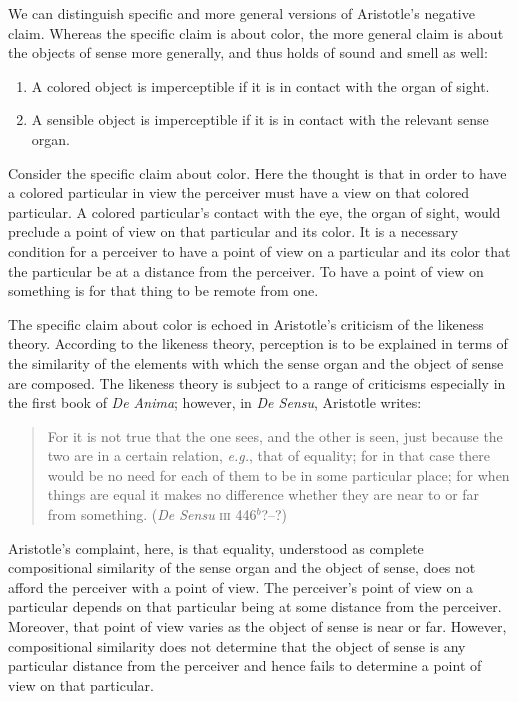 We can distinguish specific and more general versions of Aristotle's negative claim. Whereas the specific claim is about color, the more general claim is about the objects of sense more generally, and thus holds of sound and smell as well:
\begin{enumerate}[(1)]
	\item A colored object is imperceptible if it is in contact with the organ of sight.
	\item A sensible object is imperceptible if it is in contact with the relevant sense organ.
\end{enumerate}

Consider the specific claim about color. Here the thought is that in order to have a colored particular in view the perceiver must have a view on that colored particular. A colored particular's contact with the eye, the organ of sight, would preclude a point of view on that particular and its color. It is a necessary condition for a perceiver to have a point of view on a particular and its color that the particular be at a distance from the perceiver. To have a point of view on something is for that thing to be remote from one. 

The specific claim about color is echoed in Aristotle's criticism of the likeness theory. According to the likeness theory, perception is to be explained in terms of the similarity of the elements with which the sense organ and the object of sense are composed. The likeness theory is subject to a range of criticisms especially in the first book of \emph{De Anima}; however, in \emph{De Sensu}, Aristotle writes:
\begin{quote}
	For it is not true that the one sees, and the other is seen, just because the two are in a certain relation, \emph{e.g.}, that of equality; for in that case there would be no need for each of them to be in some particular place; for when things are equal it makes no difference whether they are near to or far from something. (\emph{De Sensu} \textsc{iii} 446\( ^{b} \)?--?)
\end{quote} 
Aristotle's complaint, here, is that equality, understood as complete compositional similarity of the sense organ and the object of sense, does not afford the perceiver with a point of view. The perceiver's point of view on a particular depends on that particular being at some distance from the perceiver. Moreover, that point of view varies as the object of sense is near or far. However, compositional similarity does not determine that the object of sense is any particular distance from the perceiver and hence fails to determine a point of view on that particular.

